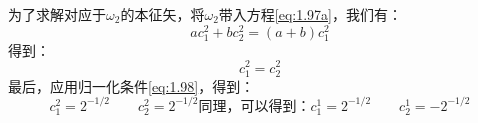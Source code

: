 为了求解对应于$\omega_2$的本征矢，将$\omega_2$带入方程\eqref{eq:1.97a}，我们有：
\[a c_1^2 + b c_2^2 = (a+b) c_1^2\]
得到：
\[c_1^2 = c_2^2\]
最后，应用归一化条件\eqref{eq:1.98}，得到：
\begin{subequations}
 \begin{equation}
     c_1^2 = 2^{-1/2}\qquad c_2^2 = 2^{-1/2}
     \label{eq:1.100a}
 \end{equation}
 同理，可以得到：
 \begin{equation}
     c_1^1 = 2^{-1/2}\qquad c_2^1 = -2^{-1/2}
     \label{eq:1.100b}
 \end{equation}
 \label{eq:1.100}
\end{subequations}


